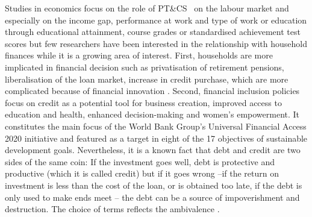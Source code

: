 \documentclass[a4paper, 11pt, onecolumn]{article}
\newcommand{\PTCS}{PT\&CS}
\begin{document}
Studies in economics focus on the role of \PTCS~ on the labour market and especially on the income gap, performance at work and type of work or education through educational attainment, course grades or standardised achievement test scores but few researchers have been interested in the relationship with household finances while it is a growing area of interest.%
First, households are more implicated in financial decision such as privatisation of retirement pensions, liberalisation of the loan market, increase in credit purchase, which are more complicated because of financial innovation \citep{Guiso2013}.
Second, financial inclusion policies focus on credit as a potential tool for business creation, improved access to education and health, enhanced decision-making and women’s empowerment. 
It constitutes the main focus of the World Bank Group's Universal Financial Access 2020 initiative and featured as a target in eight of the 17 objectives of sustainable development goals.
Nevertheless, it is a known fact that debt and credit are two sides of the same coin:
If the investment goes well, debt is protective and productive (which it is called credit) but if it goes wrong --if the return on investment is less than the cost of the loan, or is obtained too late, if the debt is only used to make ends meet \citep{Guerin2021}-- the debt can be a source of impoverishment and destruction.
The choice of terms reflects the ambivalence \citep{Peebles2010}.
\end{document}
